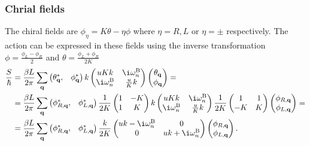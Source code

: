 \documentclass[english, parskip=full]{scrartcl}
\newcommand{\B}{\text{B}}
\begin{document}
\subsubsection{Chrial fields}
The chiral fields are $\phi_\eta = K\theta - \eta \phi$ where $\eta = R,L$ or $\eta=\pm$ respectively.
The action can be expressed in these fields using the inverse transformation $\phi = \frac{\phi_L - \phi_R}{2}$ and $\theta = \frac{\phi_L + \phi_R}{2K}$
\begin{align}
\frac{S}{\hbar} &= \frac{\beta L}{2\pi} \sum_\textbf{q} \begin{pmatrix}
\theta_\textbf{q}^\ast, & \phi_\textbf{q}^\ast
\end{pmatrix} k\begin{pmatrix}
uKk & \i\omega_n^\B \\ \i\omega_n^\B & \frac{u}{K}k
\end{pmatrix} \begin{pmatrix}
\theta_\textbf{q} \\ \phi_\textbf{q}
\end{pmatrix} = \\
&= \frac{\beta L}{2\pi} \sum_\textbf{q} \begin{pmatrix}
\phi_{R,\textbf{q}}^\ast, & \phi_{L,\textbf{q}}^\ast
\end{pmatrix} \frac{1}{2K} \begin{pmatrix}
1 & -K \\ 1 & K
\end{pmatrix} k\begin{pmatrix}
uKk & \i\omega_n^\B \\ \i\omega_n^\B & \frac{u}{K}k
\end{pmatrix} \frac{1}{2K} \begin{pmatrix}
1 & 1 \\ -K & K
\end{pmatrix} \begin{pmatrix}
\phi_{R,\textbf{q}} \\ \phi_{L,\textbf{q}}
\end{pmatrix} = \\
&= \frac{\beta L}{2\pi} \sum_\textbf{q} \begin{pmatrix}
\phi_{R,\textbf{q}}^\ast, & \phi_{L,\textbf{q}}^\ast
\end{pmatrix} \frac{k}{2K} \begin{pmatrix}
uk - \i\omega_n^\B & 0 \\ 0 & uk + \i\omega_n^\B
\end{pmatrix}  \begin{pmatrix}
\phi_{R,\textbf{q}} \\ \phi_{L,\textbf{q}}
\end{pmatrix}.
\end{align}
\end{document}
